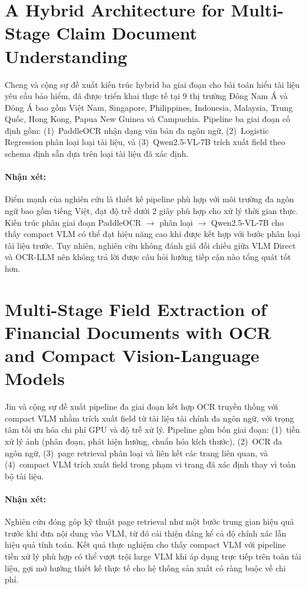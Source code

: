 ﻿\documentclass[12pt]{report}
\begin{document}
\section[Hybrid Architecture for Claim Document Understanding]{A Hybrid Architecture for Multi-Stage Claim Document Understanding}\label{sec:rw_cheng}

Cheng và cộng sự \cite{cheng2026hybrid} đề xuất kiến trúc hybrid ba giai đoạn cho bài toán hiểu tài liệu yêu cầu bảo hiểm, đã được triển khai thực tế tại 9 thị trường Đông Nam Á và Đông Á bao gồm Việt Nam, Singapore, Philippines, Indonesia, Malaysia, Trung Quốc, Hong Kong, Papua New Guinea và Campuchia. Pipeline ba giai đoạn cố định gồm: (1)~PaddleOCR nhận dạng văn bản đa ngôn ngữ, (2)~Logistic Regression phân loại loại tài liệu, và (3)~Qwen2.5-VL-7B trích xuất field theo schema định sẵn dựa trên loại tài liệu đã xác định.

\paragraph{Nhận xét:}
Điểm mạnh của nghiên cứu là thiết kế pipeline phù hợp với môi trường đa ngôn ngữ bao gồm tiếng Việt, đạt độ trễ dưới 2 giây phù hợp cho xử lý thời gian thực. Kiến trúc phân giai đoạn PaddleOCR $\rightarrow$ phân loại $\rightarrow$ Qwen2.5-VL-7B cho thấy compact VLM có thể đạt hiệu năng cao khi được kết hợp với bước phân loại tài liệu trước. Tuy nhiên, nghiên cứu không đánh giá đối chiếu giữa VLM Direct và OCR-LLM nên không trả lời được câu hỏi hướng tiếp cận nào tổng quát tốt hơn.

\section[Multi-Stage Field Extraction with Compact VLMs]{Multi-Stage Field Extraction of Financial Documents with OCR and Compact Vision-Language Models}\label{sec:rw_jin}

Jin và cộng sự \cite{jin2025multistage} đề xuất pipeline đa giai đoạn kết hợp OCR truyền thống với compact VLM nhằm trích xuất field từ tài liệu tài chính đa ngôn ngữ, với trọng tâm tối ưu hóa chi phí GPU và độ trễ xử lý. Pipeline gồm bốn giai đoạn: (1)~tiền xử lý ảnh (phân đoạn, phát hiện hướng, chuẩn hóa kích thước), (2)~OCR đa ngôn ngữ, (3)~page retrieval phân loại và liên kết các trang liên quan, và (4)~compact VLM trích xuất field trong phạm vi trang đã xác định thay vì toàn bộ tài liệu.

\paragraph{Nhận xét:}
Nghiên cứu đóng góp kỹ thuật page retrieval như một bước trung gian hiệu quả trước khi đưa nội dung vào VLM, từ đó cải thiện đáng kể cả độ chính xác lẫn hiệu quả tính toán. Kết quả thực nghiệm cho thấy compact VLM với pipeline tiền xử lý phù hợp có thể vượt trội large VLM khi áp dụng trực tiếp trên toàn tài liệu, gợi mở hướng thiết kế thực tế cho hệ thống sản xuất có ràng buộc về chi phí.
\end{document}
